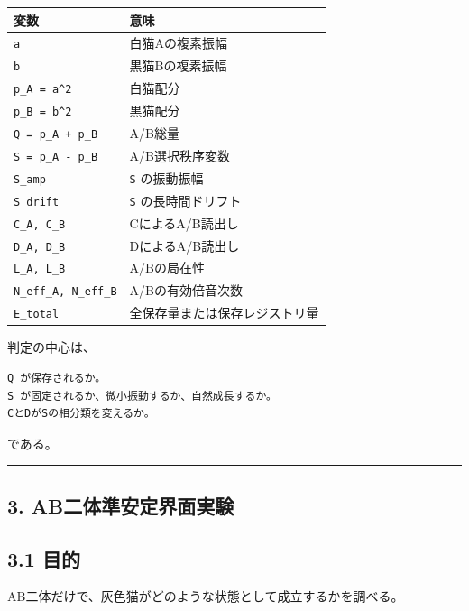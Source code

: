 \documentclass{article}
\newcounter{none}
\begin{document}
{\def\LTcaptype{none} %
\begin{longtable}[]{@{}ll@{}}
\toprule\noalign{}
変数 & 意味 \\
\midrule\noalign{}
\endhead
\bottomrule\noalign{}
\endlastfoot
\texttt{a} & 白猫Aの複素振幅 \\
\texttt{b} & 黒猫Bの複素振幅 \\
\texttt{p\_A\ =\ \textbar{}a\textbar{}\^{}2} & 白猫配分 \\
\texttt{p\_B\ =\ \textbar{}b\textbar{}\^{}2} & 黒猫配分 \\
\texttt{Q\ =\ p\_A\ +\ p\_B} & A/B総量 \\
\texttt{S\ =\ p\_A\ -\ p\_B} & A/B選択秩序変数 \\
\texttt{S\_amp} & \texttt{S} の振動振幅 \\
\texttt{S\_drift} & \texttt{S} の長時間ドリフト \\
\texttt{C\_A,\ C\_B} & CによるA/B読出し \\
\texttt{D\_A,\ D\_B} & DによるA/B読出し \\
\texttt{L\_A,\ L\_B} & A/Bの局在性 \\
\texttt{N\_eff\_A,\ N\_eff\_B} & A/Bの有効倍音次数 \\
\texttt{E\_total} & 全保存量または保存レジストリ量 \\
\end{longtable}
}

判定の中心は、

\begin{verbatim}
Q が保存されるか。
S が固定されるか、微小振動するか、自然成長するか。
CとDがSの相分類を変えるか。
\end{verbatim}

である。

\begin{center}\rule{0.5\linewidth}{0.5pt}\end{center}

\subsection{3.
AB二体準安定界面実験}\label{abux4e8cux4f53ux6e96ux5b89ux5b9aux754cux9762ux5b9fux9a13}

\subsection{3.1 目的}\label{ux76eeux7684-1}

AB二体だけで、灰色猫がどのような状態として成立するかを調べる。
\end{document}
